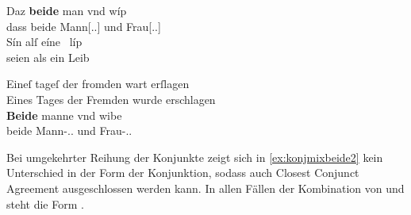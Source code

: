 \begin{exe}
\ex \label{ex:konjmixbeide1}
	\begin{xlist}
	\ex \gll Daz \textbf{beide} man vnd wíp \\
			dass beide Mann[\Nom.\Sg.\MascM] und Frau[\Nom.\Sg.\NeutF{}] \\
	\sn \gll Sín alſ eíne~ líp \\
			seien als ein Leib \\
		\begin{taggedline}{\parencites[\pno~45\vb, 12--13]{kc:VB}[vgl.][9536--9537]{schroeder1895}}
		\trans {}
		\end{taggedline}
		\label{ex:konjmixbeide1_1}

	\ex \label{ex:konjmixbeide1_2}
		\gll Eineſ tageſ der fromden wart erſlagen \\
			Eines Tages der Fremden wurde erschlagen \\
		\textelp{}
	\sn \gll \textbf{Beide} manne vnd wibe \\
			beide Mann-\Nom.\Pl.\MascM{} und Frau-\Nom.\Pl.\NeutF{} \\
		\begin{taggedline}{\parencites[\pno~3\vb, 11--14]{kc:VB}[vgl.][625--628]{schroeder1895}}
		\trans {}
		\end{taggedline}
	\end{xlist}
\end{exe}

Bei umgekehrter Reihung der Konjunkte zeigt sich in \cref{ex:konjmixbeide2}
kein Unterschied in der Form der Konjunktion, sodass auch Closest Conjunct
Agreement ausgeschlossen werden kann. In allen Fällen der Kombination von
  und   steht die
Form .

